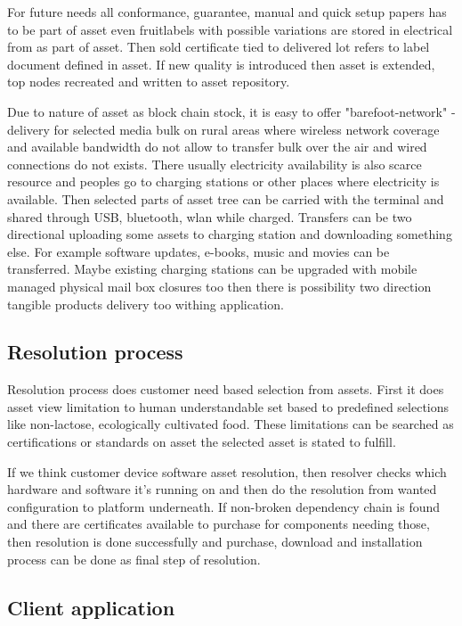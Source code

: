 For future needs all conformance, guarantee, manual and quick setup papers has
to be part of asset even fruitlabels with possible variations are stored in
electrical from as part of asset. Then sold certificate tied to delivered lot
refers to label document defined in asset. If new quality is introduced then
asset is extended, top nodes recreated and written to asset repository.

Due to nature of asset as block chain stock, it is easy to offer
"barefoot-network" -delivery for selected media bulk on rural areas where
wireless network coverage and available bandwidth do not allow to transfer
bulk over the air and wired connections do not exists. There usually
electricity availability is also scarce resource and peoples go to charging
stations or other places where electricity is available. Then selected parts
of asset tree can be carried with the terminal and shared through USB,
bluetooth, wlan while charged. Transfers can be two directional uploading some
assets to charging station and downloading something else. For example
software updates, e-books, music and movies can be transferred. Maybe existing
charging stations can be upgraded with mobile managed physical mail box
closures too then there is possibility two direction tangible products
delivery too withing application.

\subsection{Resolution process}
\label{resolution}

Resolution process does customer need based selection from assets. First it
does asset view limitation to human understandable set based to predefined
selections like non-lactose, ecologically cultivated food. These limitations
can be searched as certifications or standards on asset the selected asset is
stated to fulfill.  

If we think customer device software asset resolution, then resolver checks
which hardware and software it's running on and then do the resolution from
wanted configuration to platform underneath. If non-broken dependency chain is
found and there are certificates available to purchase for components needing
those, then resolution is done successfully and purchase, download and
installation process can be done as final step of resolution.  

\subsection{Client application}
\label{client_application}

